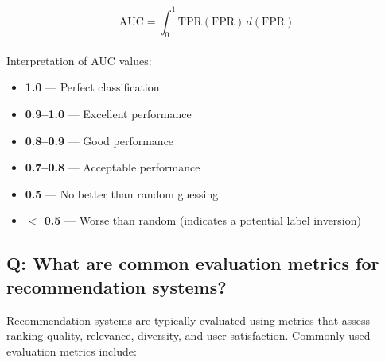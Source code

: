 \[
	\text{AUC} = \int_{0}^{1} \text{TPR}(\text{FPR}) \, d(\text{FPR})
\]
\\
Interpretation of AUC values:
\begin{itemize}
	\item \textbf{1.0} — Perfect classification
	\item \textbf{0.9–1.0} — Excellent performance
	\item \textbf{0.8–0.9} — Good performance
	\item \textbf{0.7–0.8} — Acceptable performance
	\item \textbf{0.5} — No better than random guessing
	\item \textbf{$<$ 0.5} — Worse than random (indicates a potential label inversion)
\end{itemize}

\subsection*{Q: What are common evaluation metrics for recommendation systems?}
Recommendation systems are typically evaluated using metrics that assess ranking quality, relevance, diversity, and user satisfaction. Commonly used evaluation metrics include:

